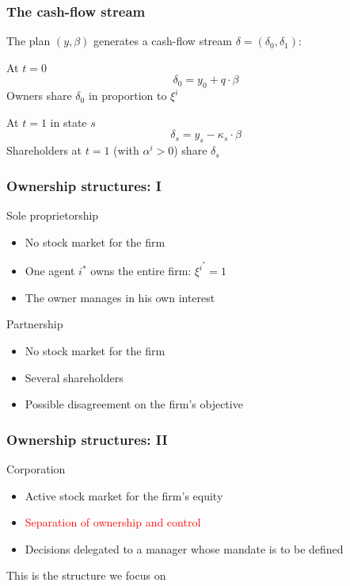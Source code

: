 \documentclass[blue]{beamer}
\theoremstyle{definition}
\theoremstyle{example}
\begin{document}
\begin{frame}\frametitle{The cash-flow stream}
The plan $(y, \beta)$ generates a cash-flow stream $\delta = (\delta_0, \delta_1)$:
\bigskip

\begin{block}{At $t=0$}
\begin{equation*}
\delta_0 = y_0 + q \cdot \beta
\end{equation*}
Owners share $\delta_0$ in proportion to $\xi^i$
\end{block}

\begin{block}{At $t=1$ in state $s$}
\begin{equation*}
\delta_s = y_s - \kappa_s \cdot \beta
\end{equation*}
Shareholders at $t=1$ (with $\alpha^i > 0$) share $\delta_s$
\end{block}
\end{frame}

\begin{frame}\frametitle{Ownership structures: I}
\begin{block}{Sole proprietorship}
\begin{itemize}
\item No stock market for the firm
\item One agent $i^\ast$ owns the entire firm: $\xi^{i^\ast} = 1$
\item The owner manages in his own interest
\end{itemize}
\end{block}

\begin{block}{Partnership}
\begin{itemize}
\item No stock market for the firm
\item Several shareholders
\item Possible disagreement on the firm's objective
\end{itemize}
\end{block}
\end{frame}

\begin{frame}\frametitle{Ownership structures: II}
\begin{block}{Corporation}
\begin{itemize}
\item Active stock market for the firm's equity
\item \textcolor{red}{Separation of ownership and control}
\item Decisions delegated to a manager whose mandate is to be defined
\end{itemize}
\end{block}
\bigskip

This is the structure we focus on
\end{frame}
\end{document}
